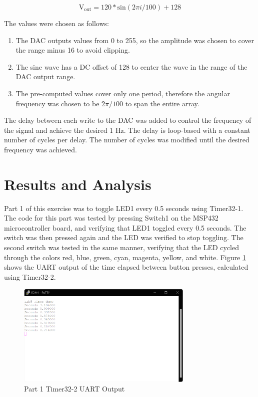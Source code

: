 \documentclass[CMPE]{KGCOEReport}
\begin{document}
\begin{equation}
\text{V}_\text{out} = 120 * \text{sin}(2\pi i / 100) + 128
\label{eq:dacEq}
\end{equation}

The values were chosen as follows:

\begin{enumerate}
    \item The DAC outputs values from 0 to 255, so the amplitude was chosen to cover the range minus 16 to avoid clipping.
    \item The sine wave has a DC offset of 128 to center the wave in the range of the DAC output range.
    \item The pre-computed values cover only one period, therefore the angular frequency was chosen to be $2\pi / 100$ to span the entire array.
\end{enumerate}

The delay between each write to the DAC was added to control the frequency of the signal and achieve the desired 1 Hz. The delay is loop-based with a constant number of cycles per delay. The number of cycles was modified until the desired frequency was achieved.


\section*{Results and Analysis}

Part 1 of this exercise was to toggle LED1 every 0.5 seconds using Timer32-1. The code for this part was tested by pressing Switch1 on the MSP432 microcontroller board, and verifying that LED1 toggled every 0.5 seconds. The switch was then pressed again and the LED was verified to stop toggling. The second switch was tested in the same manner, verifying that the LED cycled through the colors red, blue, green, cyan, magenta, yellow, and white. Figure \ref{fig:part1} shows the UART output of the time elapsed between button presses, calculated using Timer32-2.

\begin{figure}[H]
    \centering
    \includegraphics[width=0.75\textwidth]{part1.png}
    \caption{Part 1 Timer32-2 UART Output}
    \label{fig:part1}
\end{figure}
\end{document}

